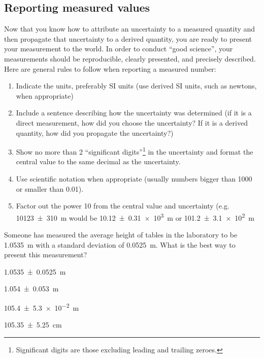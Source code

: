 \subsection{Reporting measured values}
Now that you know how to attribute an uncertainty to a measured quantity and then propagate that uncertainty to a derived quantity, you are ready to present your measurement to the world. In order to conduct ``good science'', your measurements should be reproducible, clearly presented, and precisely described. Here are general rules to follow when reporting a measured number:
\begin{enumerate}
\item Indicate the units, preferably SI units (use derived SI units, such as newtons, when appropriate)
\item Include a sentence describing how the uncertainty was determined (if it is a direct measurement, how did you choose the uncertainty? If it is a derived quantity, how did you propagate the uncertainty?)
\item Show no more than 2 ``significant digits''\footnote{Significant digits are those excluding leading and trailing zeroes.} in the uncertainty and format the central value to the same decimal as the uncertainty. 
\item Use scientific notation when appropriate (usually numbers bigger than 1000 or smaller than 0.01).
\item Factor out the power 10 from the central value and uncertainty (e.g. \SI{10123\pm 310}{m} would be \SI{10.12\pm 0.31e3}{m} or \SI{101.2\pm 3.1e2}{m} 
\end{enumerate}

\begin{checkpoint}
\begin{MCquestion}{Someone has measured the average height of tables in the laboratory to be \SI{1.0535}{m} with a standard deviation of \SI{0.0525}{m}. What is the best way to present this measurement?}
\item \SI{1.0535\pm 0.0525}{m}
\item \SI{1.054\pm 0.053}{m}
\item \SI{105.4\pm 5.3e-2}{m} \correct
\item \SI{105.35\pm 5.25}{cm}
\end{MCquestion}
\end{checkpoint}

